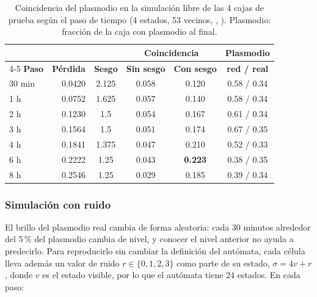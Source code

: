 \begin{table}[!t]
	\centering
	\footnotesize
	\setlength{\tabcolsep}{4pt}
	\begin{tabular}{@{}l@{}rcccc@{}}
		\toprule
		& & & \multicolumn{2}{c}{\textbf{Coincidencia}} & \textbf{Plasmodio} \\
		\cmidrule(lr){4-5}
		\textbf{Paso} & \textbf{Pérdida} & \textbf{Sesgo} & \textbf{Sin sesgo} & \textbf{Con sesgo} & \textbf{red / real} \\
		\midrule
		30 min & 0.0420 & 2.125 & 0.058 & 0.120 & 0.58 / 0.34 \\
		1 h & 0.0752 & 1.625 & 0.057 & 0.140 & 0.58 / 0.34 \\
		2 h & 0.1230 & 1.5 & 0.054 & 0.167 & 0.61 / 0.34 \\
		3 h & 0.1564 & 1.5 & 0.051 & 0.174 & 0.67 / 0.35 \\
		4 h & 0.1841 & 1.375 & 0.047 & 0.210 & 0.52 / 0.33 \\
		6 h & 0.2222 & 1.25 & 0.043 & \textbf{0.223} & 0.38 / 0.35 \\
		8 h & 0.2546 & 1.25 & 0.029 & 0.185 & 0.39 / 0.34 \\
		\bottomrule
	\end{tabular}
	\caption{Coincidencia del plasmodio en la simulación libre de las 4 cajas de prueba según el paso de tiempo (4 estados, 53 vecinos, , \onehot{}). Plasmodio: fracción de la caja con plasmodio al final.}
	\label{tab:physarum_paso}
\end{table}

\subsubsection{Simulación con ruido}
El brillo del plasmodio real cambia de forma aleatoria: cada 30 minutos alrededor del 5\,\% del plasmodio cambia de nivel, y conocer el nivel anterior no ayuda a predecirlo. Para reproducirlo sin cambiar la definición del autómata, cada célula lleva además un valor de ruido $r \in \{0,1,2,3\}$ como parte de su estado, $\sigma = 4v + r$, donde $v$ es el estado visible, por lo que el autómata tiene 24 estados. En cada paso:

